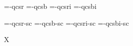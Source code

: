 

\ifx\sizespec\undefined \def\sizespec{}\fi
\ifx\font\corkencoded {}\else {}\fi

\ifx\font\unicoded  {} 
\else

\font\tenrm=\tmp-qcsr  \sizespec
\font\tenbf=\tmp-qcsb  \sizespec
\font\tenit=\tmp-qcsri \sizespec
\font\tenbi=\tmp-qcsbi \sizespec

\font\tenrmc=\tmp-qcsr-sc  \sizespec
\font\tenbfc=\tmp-qcsb-sc  \sizespec
\font\tenitc=\tmp-qcsri-sc \sizespec
\font\tenbic=\tmp-qcsbi-sc \sizespec

\fi

\tenrm

\def\caps#1{{\escapechar=-1 \expandafter}%
  \expandafter\csname\expandafter\tenonlytext\string#1c\endcsname}
\def\tenonlytext{ten}

\ifx\font\corkencoded\else \ifx\font\unicoded\else  \fi\fi
\ifx\mathpreloaded X\else  \fi                     


